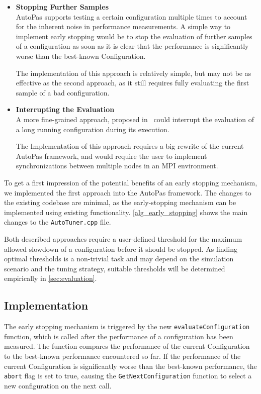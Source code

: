\documentclass[conference]{IEEEtran}
\begin{document}
\begin{itemize}
    \item \textbf{Stopping Further Samples}\\
          AutoPas supports testing a certain configuration multiple times to account for the inherent noise in performance measurements. A simple way to implement early stopping would be to stop the evaluation of further samples of a configuration as soon as it is clear that the performance is significantly worse than the best-known Configuration.

          The implementation of this approach is relatively simple, but may not be as effective as the second approach, as it still requires fully evaluating the first sample of a bad configuration.
    \item \textbf{Interrupting the Evaluation}\\
          A more fine-grained approach, proposed in~\cite{endreport.pdf} could interrupt the evaluation of a long running configuration during its execution.

          The Implementation of this approach requires a big rewrite of the current AutoPas framework, and would require the user to implement synchronizations between multiple nodes in an MPI environment.
\end{itemize}

To get a first impression of the potential benefits of an early stopping mechanism, we implemented the first approach into the AutoPas framework. The changes to the existing codebase are minimal, as the early-stopping mechanism can be implemented using existing functionality. \autoref{alg_early_stopping} shows the main changes to the \texttt{AutoTuner.cpp} file.

Both described approaches require a user-defined threshold for the maximum allowed slowdown of a configuration before it should be stopped. As finding optimal thresholds is a non-trivial task and may depend on the simulation scenario and the tuning strategy, suitable thresholds will be determined empirically in \autoref{sec:evaluation}.

\subsection{Implementation}
The early stopping mechanism is triggered by the new \texttt{evaluateConfiguration} function, which is called after the performance of a configuration has been measured. The function compares the performance of the current Configuration to the best-known performance encountered so far. If the performance of the current Configuration is significantly worse than the best-known performance, the \texttt{abort} flag is set to true, causing the \texttt{GetNextConfiguration} function to select a new configuration on the next call.
\end{document}
